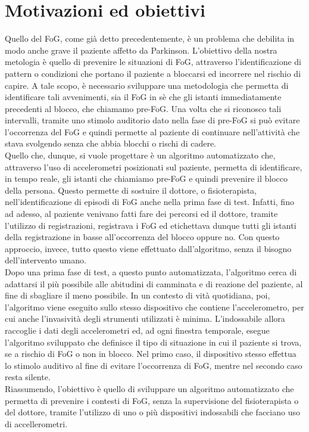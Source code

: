 
\chapter{Motivazioni ed obiettivi}\label{chap4:Goals}
Quello del FoG, come già detto precedentemente, è un problema che debilita in modo anche grave il paziente affetto da Parkinson. L'obiettivo della nostra metologia è quello di prevenire le situazioni di FoG, attraverso l'identificazione di pattern o condizioni che portano il paziente a bloccarsi ed incorrere nel rischio di capire. A tale scopo, è necessario sviluppare una metodologia che permetta di identificare tali avvenimenti, sia il FoG in sè che gli istanti immediatamente precedenti al blocco, che chiamamo pre-FoG. Una volta che si riconosco tali intervalli, tramite uno stimolo auditorio dato nella fase di pre-FoG si può evitare l'occorrenza del FoG e quindi permette al paziente di continuare nell'attività che stava svolgendo senza che abbia blocchi o rischi di cadere.\\
Quello che, dunque, si vuole progettare è un algoritmo automatizzato che, attraverso l'uso di accelerometri posizionati sul paziente, permetta di identificare, in tempo reale, gli istanti che chiamiamo pre-FoG e quindi prevenire il blocco della persona. Questo permette di sostuire il dottore, o fisioterapista, nell'identificazione di episodi di FoG anche nella prima fase di test. Infatti, fino ad adesso, al paziente venivano fatti fare dei percorsi ed il dottore, tramite l'utilizzo di registrazioni, registrava i FoG ed etichettava dunque tutti gli istanti della registrazione in basse all'occorrenza del blocco oppure no. Con questo approccio, invece, tutto questo viene effettuato dall'algoritmo, senza il bisogno dell'intervento umano.\\
Dopo una prima fase di test, a questo punto automatizzata, l'algoritmo cerca di adattarsi il più possibile alle abitudini di camminata e di reazione del paziente, al fine di sbagliare il meno possibile. In un contesto di vità quotidiana, poi, l'algoritmo viene eseguito sullo stesso dispositivo che contiene l'accelerometro, per cui anche l'invasività degli strumenti utilizzati è minima. L'indossabile allora raccoglie i dati degli accelerometri ed, ad ogni finestra temporale, esegue l'algoritmo sviluppato che definisce il tipo di situazione in cui il paziente si trova, se a rischio di FoG o non in blocco. Nel primo caso, il dispositivo stesso effettua lo stimolo auditivo al fine di evitare l'occorrenza di FoG, mentre nel secondo caso resta silente.\\
Riassumendo, l'obiettivo è quello di sviluppare un algoritmo automatizzato che permetta di prevenire i contesti di FoG, senza la supervisione del fisioterapista o del dottore, tramite l'utilizzo di uno o più dispositivi indossabili che facciano uso di accellerometri.
